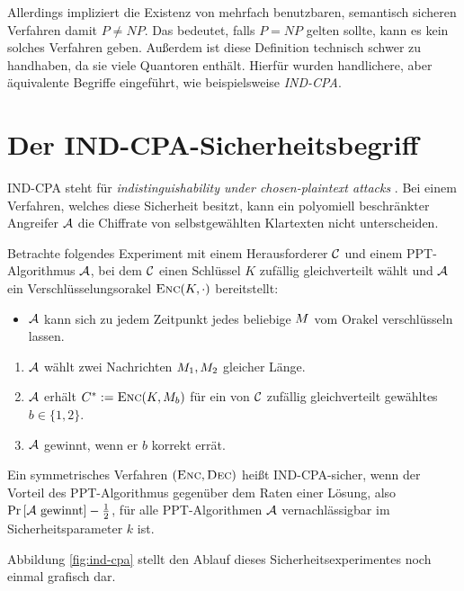 Allerdings impliziert die Existenz von mehrfach benutzbaren, semantisch
sicheren Verfahren damit $P \neq NP$. Das bedeutet, falls $P = NP$
gelten sollte, kann es kein solches Verfahren geben. Außerdem ist diese
Definition technisch schwer zu handhaben, da sie viele Quantoren
enthält. Hierfür wurden handlichere, aber äquivalente Begriffe
eingeführt, wie beispielsweise \emph{IND-CPA}.

\section{Der IND-CPA-Sicherheitsbegriff}\label{sec:ind-cpa} IND-CPA
steht für \emph{indistinguishability under chosen-plaintext attacks}
\indexINDCPA. Bei einem Verfahren, welches diese Sicherheit besitzt,
kann ein polyomiell beschränkter Angreifer $\mathcal{A}$ die Chiffrate von
selbstgewählten Klartexten nicht unterscheiden.
\begin{definition} Betrachte folgendes Experiment
  mit einem Herausforderer $\mathcal{C}$ und einem PPT-Algorithmus $\mathcal{A}$, bei dem
  $\mathcal{C}$ einen Schlüssel $K$ zufällig gleichverteilt wählt und $\mathcal{A}$ ein
  Verschlüsselungsorakel $\textsc{Enc}(K,\cdot)$ bereitstellt:
  \begin{itemize}
  \item $\mathcal{A}$ kann sich zu jedem Zeitpunkt jedes beliebige
    $M$ vom Orakel verschlüsseln lassen.
  \end{itemize}
  \begin{enumerate}
  \item $\mathcal{A}$ wählt zwei Nachrichten $M_1, M_2$
    gleicher Länge.
  \item $\mathcal{A}$ erhält $C^{*} := \textsc{Enc}(K,
    M_{b})$ für ein von $\mathcal{C}$ zufällig gleichverteilt gewähltes $b \in
    \{1, 2\}$.
  \item $\mathcal{A}$ gewinnt, wenn er $b$ korrekt errät.
  \end{enumerate} Ein symmetrisches Verfahren $(\textsc{Enc}, \textsc{Dec})$ heißt
  IND-CPA-sicher, wenn der Vorteil des PPT-Algorithmus gegenüber dem Raten
  einer Lösung, also $\Pr \left[ \mathcal{A} \textnormal{ gewinnt} \right] -
  \frac{1}{2}$, für alle PPT-Algorithmen $\mathcal{A}$ vernachlässigbar im
  Sicherheitsparameter $k$ ist.
\end{definition} Abbildung \ref{fig:ind-cpa} stellt den Ablauf dieses
Sicherheitsexperimentes noch einmal grafisch dar.

